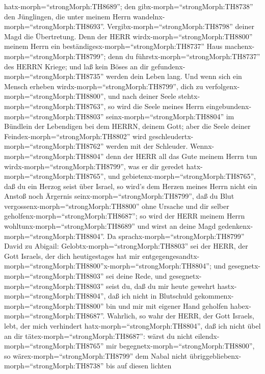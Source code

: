 hatx-morph=``strongMorph:TH8689''; den gibx-morph=``strongMorph:TH8738''
den Jünglingen, die unter meinem Herrn
wandelnx-morph=``strongMorph:TH8693''. 
Vergibx-morph=``strongMorph:TH8798'' deiner Magd die Übertretung. Denn
der HERR wirdx-morph=``strongMorph:TH8800'' meinem Herrn ein
beständigesx-morph=``strongMorph:TH8737'' Haus
machenx-morph=``strongMorph:TH8799''; denn du
führstx-morph=``strongMorph:TH8737'' des HERRN Kriege; und laß kein
Böses an dir gefundenx-morph=``strongMorph:TH8735'' werden dein Leben
lang.  Und wenn sich ein Mensch erheben
wirdx-morph=``strongMorph:TH8799'', dich zu
verfolgenx-morph=``strongMorph:TH8800'', und nach deiner Seele
stehtx-morph=``strongMorph:TH8763'', so wird die Seele meines Herrn
eingebundenx-morph=``strongMorph:TH8803''
seinx-morph=``strongMorph:TH8804'' im Bündlein der Lebendigen bei dem
HERRN, deinem Gott; aber die Seele deiner
Feindex-morph=``strongMorph:TH8802'' wird
geschleudertx-morph=``strongMorph:TH8762'' werden mit der Schleuder.
 Wennx-morph=``strongMorph:TH8804'' denn der HERR all das
Gute meinem Herrn tun wirdx-morph=``strongMorph:TH8799'', was er dir
geredet hatx-morph=``strongMorph:TH8765'', und
gebietenx-morph=``strongMorph:TH8765'', daß du ein Herzog seist über
Israel,  so wird's dem Herzen meines Herrn nicht ein Anstoß
noch Ärgernis seinx-morph=``strongMorph:TH8799'', daß du Blut
vergossenx-morph=``strongMorph:TH8800'' ohne Ursache und dir selber
geholfenx-morph=``strongMorph:TH8687''; so wird der HERR meinem Herrn
wohltunx-morph=``strongMorph:TH8689'' und wirst an deine Magd
gedenkenx-morph=``strongMorph:TH8804''.  Da
sprachx-morph=``strongMorph:TH8799'' David zu Abigail:
Gelobtx-morph=``strongMorph:TH8803'' sei der HERR, der Gott Israels, der
dich heutigestages hat mir
entgegengesandtx-morph=``strongMorph:TH8800''x-morph=``strongMorph:TH8804'';
 und gesegnetx-morph=``strongMorph:TH8803'' sei deine Rede,
und gesegnetx-morph=``strongMorph:TH8803'' seist du, daß du mir heute
gewehrt hastx-morph=``strongMorph:TH8804'', daß ich nicht in Blutschuld
gekommenx-morph=``strongMorph:TH8800'' bin und mir mit eigener Hand
geholfen habex-morph=``strongMorph:TH8687''.  Wahrlich, so
wahr der HERR, der Gott Israels, lebt, der mich verhindert
hatx-morph=``strongMorph:TH8804'', daß ich nicht übel an dir
tätex-morph=``strongMorph:TH8687'': wärst du nicht
eilendx-morph=``strongMorph:TH8765'' mir
begegnetx-morph=``strongMorph:TH8800'', so
wärex-morph=``strongMorph:TH8799'' dem Nabal nicht
übriggebliebenx-morph=``strongMorph:TH8738'' bis auf diesen lichten
